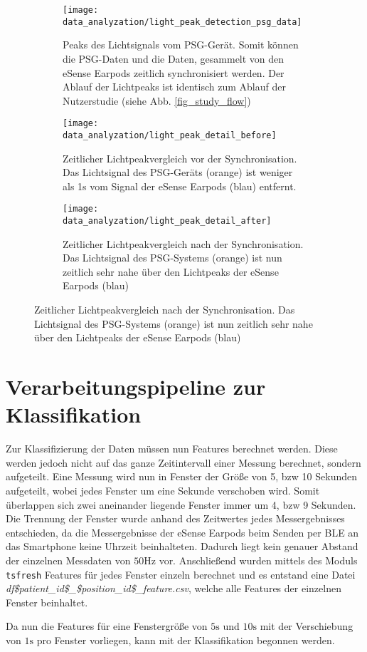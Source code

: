 \begin{figure}[ht]
  \centering
  \begin{subfigure}{0.66\textwidth}
    \texttt{[image: data\_analyzation/light\_peak\_detection\_psg\_data]}
    \caption{Peaks des Lichtsignals vom PSG-Gerät. Somit können die PSG-Daten und die Daten, gesammelt von den eSense Earpods zeitlich synchronisiert werden. Der Ablauf der Lichtpeaks ist identisch zum Ablauf der Nutzerstudie (siehe Abb. \ref{fig_study_flow}) }
    \label{implementation:synchronisation:light_peaks_detection}
  \end{subfigure}
  \begin{subfigure}{.49\textwidth}
    \texttt{[image: data\_analyzation/light\_peak\_detail\_before]}
    \caption{Zeitlicher Lichtpeakvergleich vor der Synchronisation. Das Lichtsignal des PSG-Geräts (orange) ist weniger als 1s vom Signal der eSense Earpods (blau) entfernt. }
    \label{implementation:synchronisation:before_light_peak}
  \end{subfigure}
  \begin{subfigure}{.49\textwidth}
    \texttt{[image: data\_analyzation/light\_peak\_detail\_after]}
    \caption{Zeitlicher Lichtpeakvergleich nach der Synchronisation. Das Lichtsignal des PSG-Systems (orange) ist nun zeitlich sehr nahe über den Lichtpeaks der eSense Earpods (blau)}
    \label{implementation:synchronisation:after_light_peak}
  \end{subfigure}
  \label{implementation:synchronisation}
\end{figure}

\section{Verarbeitungspipeline zur Klassifikation}
\label{ch:Implementierung:classification_pipeline}
Zur Klassifizierung der Daten müssen nun Features berechnet werden. 
Diese werden jedoch nicht auf das ganze Zeitintervall einer Messung berechnet, sondern aufgeteilt.
Eine Messung wird nun in Fenster der Größe von 5, bzw 10 Sekunden aufgeteilt, wobei jedes Fenster um eine Sekunde verschoben wird. 
Somit überlappen sich zwei aneinander liegende Fenster immer um 4, bzw 9 Sekunden. 
Die Trennung der Fenster wurde anhand des Zeitwertes jedes Messergebnisses entschieden, da die Messergebnisse der eSense Earpods beim Senden per BLE an das Smartphone keine Uhrzeit beinhalteten.
Dadurch liegt kein genauer Abstand der einzelnen Messdaten von $50\si{\hertz}$ vor. 
Anschließend wurden mittels des Moduls \texttt{tsfresh} Features für jedes Fenster einzeln berechnet und es entstand eine Datei \textit{df\$patient\_id\$\_\$position\_id\$\_feature.csv}, welche alle Features der einzelnen Fenster beinhaltet.

Da nun die Features für eine Fenstergröße von $5\si{\s}$ und $10\si{\s}$ mit der Verschiebung von $1\si{\s}$ pro Fenster vorliegen, kann mit der Klassifikation begonnen werden.